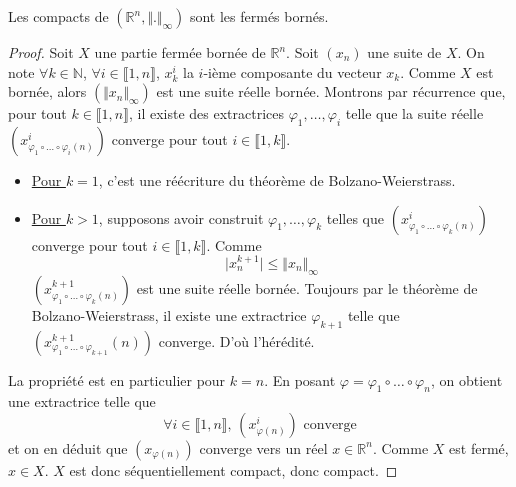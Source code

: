 






  \begin{lemma}
    \label{equivalence-des-normes-en-dimension-finie-et-theoreme-de-riesz-1}
    Les compacts de $(\mathbb{R}^n, \Vert . \Vert_\infty)$ sont les fermés bornés.
  \end{lemma}

  \begin{proof}
    Soit $X$ une partie fermée bornée de $\mathbb{R}^n$. Soit $(x_n)$ une suite de $X$. On note $\forall k \in \mathbb{N}$, $\forall i \in \llbracket 1, n \rrbracket$, $x_k^i$ la $i$-ième composante du vecteur $x_k$. Comme $X$ est bornée, alors $(\Vert x_n \Vert_\infty)$ est une suite réelle bornée. Montrons par récurrence que, pour tout $k \in \llbracket 1, n \rrbracket$, il existe des extractrices $\varphi_1, \dots, \varphi_i$ telle que la suite réelle $(x^i_{\varphi_1 \circ \dots \circ \varphi_i (n)})$ converge pour tout $i \in \llbracket 1, k \rrbracket$.
    \begin{itemize}
      \item \uline{Pour $k = 1$}, c'est une réécriture du théorème de Bolzano-Weierstrass.
      \item \uline{Pour $k > 1$}, supposons avoir construit $\varphi_1, \dots, \varphi_k$ telles que $(x^i_{\varphi_1 \circ \dots \circ \varphi_k (n)})$ converge pour tout $i \in \llbracket 1, k \rrbracket$. Comme
      \[ \vert x^{k+1}_n \vert \leq \Vert x_n \Vert_\infty \]
      $(x^{k+1}_{\varphi_1 \circ \dots \circ \varphi_k (n)})$ est une suite réelle bornée. Toujours par le théorème de Bolzano-Weierstrass, il existe une extractrice $\varphi_{k+1}$ telle que $(x^{k+1}_{\varphi_1 \circ \dots \circ \varphi_{k+1}}(n))$ converge. D'où l'hérédité.
    \end{itemize}
    La propriété est en particulier pour $k = n$. En posant $\varphi = \varphi_1 \circ \dots \circ \varphi_n$, on obtient une extractrice telle que
    \[ \forall i \in \llbracket 1, n \rrbracket, \, (x^i_{\varphi(n)}) \text{ converge} \]
    et on en déduit que $(x_{\varphi(n)})$ converge vers un réel $x \in \mathbb{R}^n$. Comme $X$ est fermé, $x \in X$. $X$ est donc séquentiellement compact, donc compact.
  \end{proof}

